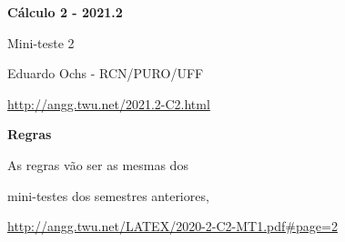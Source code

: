 \documentclass[oneside,12pt]{article}
\begin{document}



\def\u#1{\par{\footnotesize \url{#1}}}

\def\drafturl{http://angg.twu.net/LATEX/2021-2-C2.pdf}
\def\drafturl{http://angg.twu.net/2021.2-C2.html}
\def\draftfooter{\tiny \href{\drafturl}{\jobname{}} \ColorBrown{\shorttoday{} \hours}}



%

\thispagestyle{empty}

\begin{center}

\vspace*{1.2cm}

{\bf \Large Cálculo 2 - 2021.2}

\bsk

Mini-teste 2

\bsk

Eduardo Ochs - RCN/PURO/UFF

\url{http://angg.twu.net/2021.2-C2.html}

\end{center}

\newpage


{\bf Regras}

As regras vão ser as mesmas dos

mini-testes dos semestres anteriores,

\ssk

{\footnotesize

\url{http://angg.twu.net/LATEX/2020-2-C2-MT1.pdf#page=2}

}
\end{document}
